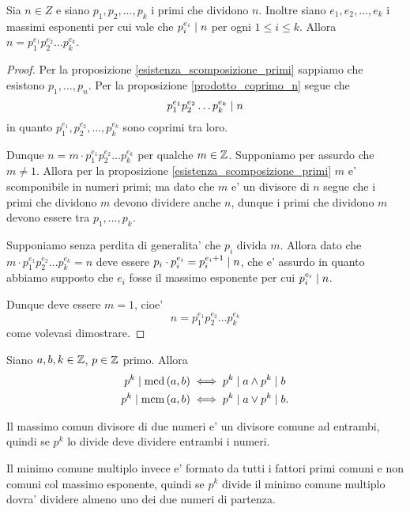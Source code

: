 \begin{theorem}
    Sia $n \in Z$ e siano $p_1, p_2, \dots, p_k$ i primi che dividono $n$. Inoltre siano $e_1, e_2, \dots, e_k$ i massimi esponenti per cui vale che $p_i^{e_i} \mid n$ per ogni $1 \leq i \leq k$. Allora $n = p_1^{e_1}p_2^{e_2} \dots p_k^{e_k}$.
\end{theorem}
\begin{proof}
    Per la proposizione \ref{esistenza_scomposizione_primi} sappiamo che esistono $p_1, \dots, p_n$. Per la proposizione \ref{prodotto_coprimo_n} segue che \[
        p_1^{e_1}p_2^{e_2} \dots p_k^{e_k} \mid n    
    \]
    in quanto $p_1^{e_1}, p_2^{e_2}, \dots, p_k^{e_k}$ sono coprimi tra loro.

    Dunque $n = m \cdot p_1^{e_1}p_2^{e_2} \dots p_k^{e_k}$ per qualche $m \in \mathbb{Z}$.
    Supponiamo per assurdo che $m \neq 1$. Allora per la proposizione \ref{esistenza_scomposizione_primi} $m$ e' scomponibile in numeri primi; ma dato che $m$ e' un divisore di $n$ segue che i primi che dividono $m$ devono dividere anche $n$, dunque i primi che dividono $m$ devono essere tra $p_1, \dots, p_k$. 

    Supponiamo senza perdita di generalita' che $p_i$ divida $m$. Allora dato che $m \cdot p_1^{e_1}p_2^{e_2} \dots p_k^{e_k} = n$ deve essere $p_i \cdot p_i^{e_i} = p_i^{e_i+1} \mid n$, che e' assurdo in quanto abbiamo supposto che $e_i$ fosse il massimo esponente per cui $p_i^{e_i} \mid n$. 
    
    Dunque deve essere $m = 1$, cioe' \[
        n = p_1^{e_1}p_2^{e_2} \dots p_k^{e_k}
    \]
    come volevasi dimostrare.
\end{proof}

\begin{proposition}\label{mcd_mcm_in_termini_di_divisori_primi}
    Siano $a, b, k \in \mathbb{Z}$, $p \in \mathbb{Z}$ primo. Allora
    \begin{alignat}{1}
        p^k \mid \operatorname{mcd}\left(a, b\right) &\iff p^k \mid a \land p^k \mid b \\ 
        p^k \mid \operatorname{mcm}\left(a, b\right) &\iff p^k \mid a \lor p^k \mid b.
    \end{alignat}
\end{proposition}
\begin{intuition}
    Il massimo comun divisore di due numeri e' un divisore comune ad entrambi, quindi se $p^k$ lo divide deve dividere entrambi i numeri.

    Il minimo comune multiplo invece e' formato da tutti i fattori primi comuni e non comuni col massimo esponente, quindi se $p^k$ divide il minimo comune multiplo dovra' dividere almeno uno dei due numeri di partenza.
\end{intuition}

